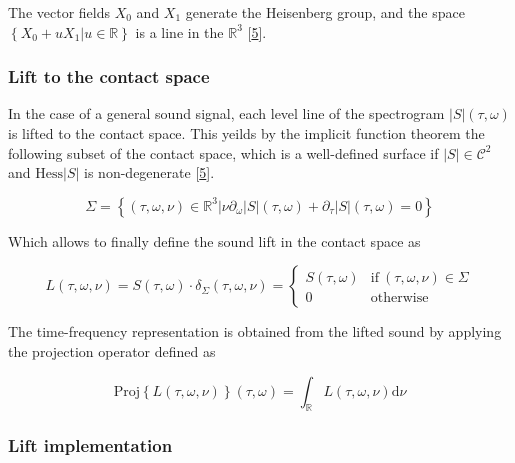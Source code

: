 \documentclass[american,]{article}
\theoremstyle{definition}
\theoremstyle{definition}
\theoremstyle{definition}
\theoremstyle{remark}
\begin{document}
The vector fields \(X_0\) and \(X_1\) generate the Heisenberg group,
and the space \(\left\{X_0+uX_1\vert u\in\mathbb{R}\right\}\) is a line in the \(\mathbb{R}^3\) {[}\protect\hyperlink{ref-boscain2021}{5}{]}.

\hypertarget{lift-to-the-contact-space}{%
\subsubsection{Lift to the contact space}\label{lift-to-the-contact-space}}

In the case of a general sound signal, each level line of the spectrogram
\(\left\lvert S\right\rvert(\tau,\omega)\) is lifted to the contact space.
This yeilds by the implicit function theorem the following subset
of the contact space, which is a well-defined surface
if \(\left\lvert S\right\rvert\in\mathcal{C}^2\) and \(\mathrm{Hess}\left\lvert S\right\rvert\) is non-degenerate {[}\protect\hyperlink{ref-boscain2021}{5}{]}.

\begin{equation}
\Sigma = \left\{(\tau,\omega,\nu)\in\mathbb{R}^3 \vert\nu\partial_\omega\left\lvert S\right\rvert(\tau,\omega) + \partial_\tau\left\lvert S\right\rvert(\tau,\omega) = 0\right\}
\end{equation}

Which allows to finally define the sound lift in the contact space as

\begin{equation}
L(\tau,\omega,\nu) = S(\tau,\omega)\cdot\delta_\Sigma (\tau,\omega,\nu) =
\begin{cases}
S(\tau,\omega) & \text{if}~(\tau,\omega,\nu)\in\Sigma\\
0          & \text{otherwise}
\end{cases}
\end{equation}

The time-frequency representation is obtained from the lifted sound
by applying the projection operator defined as

\begin{equation}
\mathrm{Proj}\left\{L(\tau,\omega,\nu)\right\}(\tau,\omega) = \int_\mathbb{R}L(\tau,\omega,\nu)\mathrm{d}\nu
\end{equation}

\hypertarget{lift-implementation}{%
\subsubsection{Lift implementation}\label{lift-implementation}}
\end{document}
